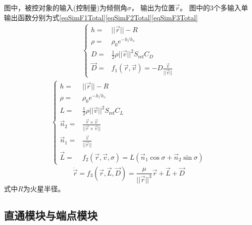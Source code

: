 图中，被控对象的输入(控制量)为倾侧角$\sigma$，
输出为位置$\vec{r}$。
图中的3个多输入单输出函数分别为式\eqref{eqSimF1Total}\eqref{eqSimF2Total}\eqref{eqSimF3Total}
\begin{align}
    \left\{\begin{aligned}
    h =& ||\vec{r}||-R \\
    \rho =& \rho_0e^{-h/h_s} \\
    D =& \frac{1}{2}\rho||\vec{v}||^2S_{\text{ref}}C_D \\
    \vec{D} =& f_1(\vec{r},\vec{v}) = -D\frac{\vec{v}}{||\vec{v}||}
\end{aligned}\right. \label{eqSimF1Total}
\end{align}
\begin{align}
    \left\{\begin{aligned}
    h =& ||\vec{r}||-R \\
    \rho =& \rho_0e^{-h/h_s} \\
    L =& \frac{1}{2}\rho||\vec{v}||^2S_{\text{ref}}C_L \\
    \vec{n}_2 =& \frac{\vec{r}\times\vec{v}}{||\vec{r}\times\vec{v}||} \\
    \vec{n}_1 =& \frac{\vec{r}}{||\vec{r}||} \\
    \vec{L} =& f_2(\vec{r},\vec{v},\sigma) = L(\vec{n}_1\cos\sigma + \vec{n}_2\sin\sigma)
\end{aligned}\right. \label{eqSimF2Total}
\end{align}
\begin{equation}
    \ddot{\vec{r}} = f_3(\vec{r},\vec{L},\vec{D}) = \frac{\mu}{||\vec{r}||^3}\vec{r}+\vec{L}+\vec{D} \label{eqSimF3Total}
\end{equation}
式中$R$为火星半径。

\subsection{直通模块与端点模块}

